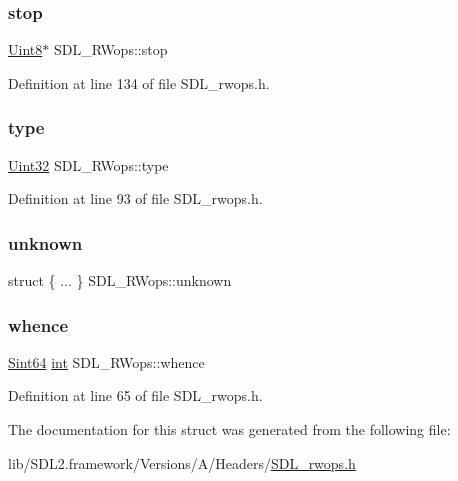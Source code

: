 \subsubsection{\texorpdfstring{stop}{stop}}
{\footnotesize\ttfamily \mbox{\hyperlink{_s_d_l__stdinc_8h_a2944638813a090aa23e62f4da842c3e2}{Uint8}}$\ast$ S\+D\+L\+\_\+\+R\+Wops\+::stop}



Definition at line 134 of file S\+D\+L\+\_\+rwops.\+h.

\mbox{\label{struct_s_d_l___r_wops_a099017bfceaac24ced0e4d08a4e0a023}} 
\subsubsection{\texorpdfstring{type}{type}}
{\footnotesize\ttfamily \mbox{\hyperlink{_s_d_l__stdinc_8h_add440eff171ea5f55cb00c4a9ab8672d}{Uint32}} S\+D\+L\+\_\+\+R\+Wops\+::type}



Definition at line 93 of file S\+D\+L\+\_\+rwops.\+h.

\mbox{\label{struct_s_d_l___r_wops_a5c2ef3288fcf78cc28f1b4b16b32eca1}} 
\subsubsection{\texorpdfstring{unknown}{unknown}}
{\footnotesize\ttfamily struct \{ ... \}   S\+D\+L\+\_\+\+R\+Wops\+::unknown}

\mbox{\label{struct_s_d_l___r_wops_a95b96dcc6690897bfaf2d059f4378ed2}} 
\subsubsection{\texorpdfstring{whence}{whence}}
{\footnotesize\ttfamily \mbox{\hyperlink{_s_d_l__stdinc_8h_a2c1a61d5c466bb74680be0a8cc1b455d}{Sint64}} \mbox{\hyperlink{struct_s_d_l___r_wops_ab303bcbb0f6742a141ba8b2998923f47}{int}} S\+D\+L\+\_\+\+R\+Wops\+::whence}



Definition at line 65 of file S\+D\+L\+\_\+rwops.\+h.



The documentation for this struct was generated from the following file\+:\begin{DoxyCompactItemize}
\item 
lib/\+S\+D\+L2.\+framework/\+Versions/\+A/\+Headers/\mbox{\hyperlink{_s_d_l__rwops_8h}{S\+D\+L\+\_\+rwops.\+h}}\end{DoxyCompactItemize}
